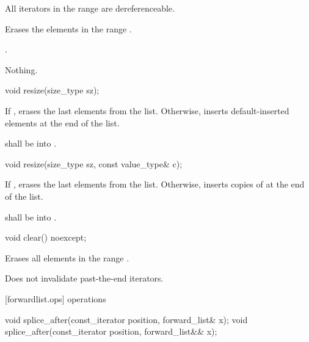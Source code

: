 \begin{itemdescr}
\pnum
\requires All iterators in the range  are dereferenceable.

\pnum
\effects Erases the elements in the range .

\pnum
\returns {}.

\pnum
\throws Nothing.
\end{itemdescr}

%
\begin{itemdecl}
void resize(size_type sz);
\end{itemdecl}

\begin{itemdescr}
\pnum
\effects If , erases the last  elements from the list. Otherwise, inserts  default-inserted
elements at the end of the list.

\pnum
\requires {} shall be  into .
\end{itemdescr}

\begin{itemdecl}
void resize(size_type sz, const value_type& c);
\end{itemdecl}

\begin{itemdescr}
\pnum
\effects If , erases the last  elements from the list. Otherwise, inserts   
copies of  at the end of the list.

\pnum
\requires {} shall be  into .
\end{itemdescr}


%
\begin{itemdecl}
void clear() noexcept;
\end{itemdecl}

\begin{itemdescr}
\pnum
\effects Erases all elements in the range .

\pnum
\remarks Does not invalidate past-the-end iterators.
\end{itemdescr}

[forwardlist.ops]{ operations}

%
\begin{itemdecl}
void splice_after(const_iterator position, forward_list& x);
void splice_after(const_iterator position, forward_list&& x);
\end{itemdecl}

